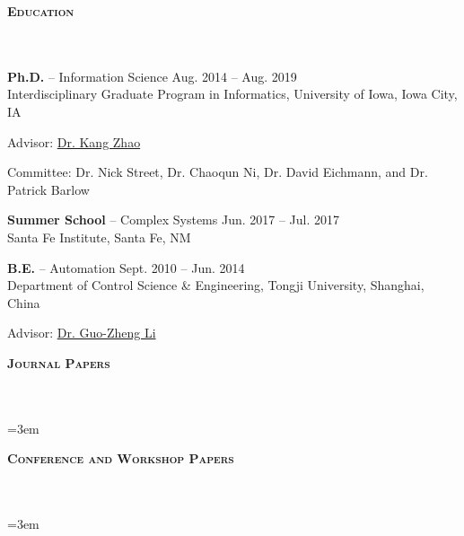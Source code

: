 \documentclass{article}
\newcommand{\header}[1]{{
\hspace*{-15pt}\vspace*{6pt} \textbf{\textsc{\large{#1}}}} \vspace*{-6pt} 
\lineunder
}
\newcommand{\lineunder}{
\vspace*{-8pt} \\ \hspace*{-15pt} 
\hrulefill \\
}
\newcommand{\employer}[4]{{
\vspace*{2pt}%
\textbf{#1} #2 \hfill #3\\ #4 \vspace*{2pt}}
}
\renewcommand{\labelitemii}{
$\vcenter{\hbox{\tiny$\bullet$}}$\hspace*{-3pt}
}
\newenvironment{bullet-list-minor}{
\begin{list}{\labelitemii}{\setlength\leftmargin{15pt} 
\topsep 0pt \itemsep -2pt}}{\vspace*{4pt}\end{list}
}
\begin{document}
\vspace*{4pt}%
\header{Education}
    \employer{Ph.D.}{-- Information Science}{Aug. 2014 -- Aug. 2019}{Interdisciplinary Graduate Program in Informatics, University of Iowa, Iowa City, IA}
	\begin{bullet-list-minor}
        \item Advisor: \href{www.kangzhao.net}{Dr. Kang Zhao}
        \item Committee: Dr. Nick Street, Dr. Chaoqun Ni, Dr. David Eichmann, and Dr. Patrick Barlow
    \end{bullet-list-minor}
    
    \employer{Summer School}{-- Complex Systems}{Jun. 2017 -- Jul. 2017}{Santa Fe Institute, Santa Fe, NM}
    
    \employer{B.E.}{-- Automation}{Sept. 2010 -- Jun. 2014}{Department of Control Science \& Engineering, Tongji University, Shanghai, China}
	\begin{bullet-list-minor}
        \item Advisor: \href{http://www.ndctcm.cn/gzli/}{Dr. Guo-Zheng Li}
    \end{bullet-list-minor}
    
\vspace*{4pt}%
\header{Journal Papers}

\nocite{*}
\newrefcontext[labelprefix=J]
\emergencystretch=3em
\printbibliography[heading=none,keyword={J}] 

\vspace*{4pt}%
\header{Conference and Workshop Papers}

\nocite{*}
\newrefcontext[labelprefix=C]
\emergencystretch=3em
\printbibliography[keyword={C},heading=none] 
\end{document}
